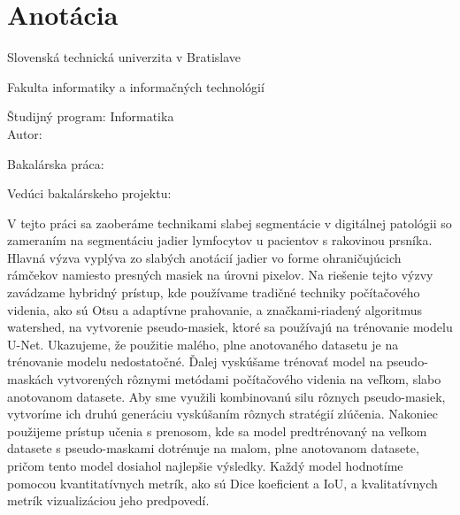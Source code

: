 

\newpage{}\thispagestyle{empty}



\thispagestyle{empty}
\section*{Anotácia}

\begin{minipage}[t]{1\columnwidth}%
Slovenská technická univerzita v Bratislave

Fakulta informatiky a informačných technológií

Študijný program: Informatika\\

Autor: \myName

Bakalárska práca: \myTitle

Vedúci bakalárskeho projektu: \mySupervisor

\myDateSK%
\end{minipage}

\bigskip{}

V tejto práci sa zaoberáme technikami slabej segmentácie v digitálnej patológii so zameraním na segmentáciu jadier lymfocytov u pacientov s rakovinou prsníka. Hlavná výzva vyplýva zo slabých anotácií jadier vo forme ohraničujúcich rámčekov namiesto presných masiek na úrovni pixelov. Na riešenie tejto výzvy zavádzame hybridný prístup, kde používame tradičné techniky počítačového videnia, ako sú Otsu a adaptívne prahovanie, a značkami-riadený algoritmus watershed, na vytvorenie pseudo-masiek, ktoré sa používajú na trénovanie modelu U-Net. Ukazujeme, že použitie malého, plne anotovaného datasetu je na trénovanie modelu nedostatočné. Ďalej vyskúšame trénovať model na pseudo-maskách vytvorených rôznymi metódami počítačového videnia na veľkom, slabo anotovanom datasete. Aby sme využili kombinovanú silu rôznych pseudo-masiek, vytvoríme ich druhú generáciu vyskúšaním rôznych stratégií zlúčenia. Nakoniec použijeme prístup učenia s prenosom, kde sa model predtrénovaný na veľkom datasete s pseudo-maskami dotrénuje na malom, plne anotovanom datasete, pričom tento model dosiahol najlepšie výsledky. Každý model hodnotíme pomocou kvantitatívnych metrík, ako sú Dice koeficient a IoU, a kvalitatívnych metrík vizualizáciou jeho predpovedí.



\newpage{}\thispagestyle{empty}\medskip{}


\newpage{}



\newpage

